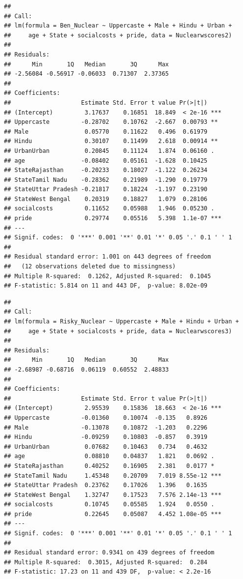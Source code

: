 \documentclass[
]{article}
\begin{document}
\begin{verbatim}
## 
## Call:
## lm(formula = Ben_Nuclear ~ Uppercaste + Male + Hindu + Urban + 
##     age + State + socialcosts + pride, data = Nuclearwscores2)
## 
## Residuals:
##      Min       1Q   Median       3Q      Max 
## -2.56084 -0.56917 -0.06033  0.71307  2.37365 
## 
## Coefficients:
##                    Estimate Std. Error t value Pr(>|t|)    
## (Intercept)         3.17637    0.16851  18.849  < 2e-16 ***
## Uppercaste         -0.28702    0.10762  -2.667  0.00793 ** 
## Male                0.05770    0.11622   0.496  0.61979    
## Hindu               0.30107    0.11499   2.618  0.00914 ** 
## UrbanUrban          0.20845    0.11124   1.874  0.06160 .  
## age                -0.08402    0.05161  -1.628  0.10425    
## StateRajasthan     -0.20233    0.18027  -1.122  0.26234    
## StateTamil Nadu    -0.28362    0.21989  -1.290  0.19779    
## StateUttar Pradesh -0.21817    0.18224  -1.197  0.23190    
## StateWest Bengal    0.20319    0.18827   1.079  0.28106    
## socialcosts         0.11652    0.05988   1.946  0.05230 .  
## pride               0.29774    0.05516   5.398  1.1e-07 ***
## ---
## Signif. codes:  0 '***' 0.001 '**' 0.01 '*' 0.05 '.' 0.1 ' ' 1
## 
## Residual standard error: 1.001 on 443 degrees of freedom
##   (12 observations deleted due to missingness)
## Multiple R-squared:  0.1262, Adjusted R-squared:  0.1045 
## F-statistic: 5.814 on 11 and 443 DF,  p-value: 8.02e-09
\end{verbatim}

\begin{verbatim}
## 
## Call:
## lm(formula = Risky_Nuclear ~ Uppercaste + Male + Hindu + Urban + 
##     age + State + socialcosts + pride, data = Nuclearwscores3)
## 
## Residuals:
##      Min       1Q   Median       3Q      Max 
## -2.68987 -0.68716  0.06119  0.60552  2.48833 
## 
## Coefficients:
##                    Estimate Std. Error t value Pr(>|t|)    
## (Intercept)         2.95539    0.15836  18.663  < 2e-16 ***
## Uppercaste         -0.01360    0.10074  -0.135   0.8926    
## Male               -0.13078    0.10872  -1.203   0.2296    
## Hindu              -0.09259    0.10803  -0.857   0.3919    
## UrbanUrban          0.07682    0.10463   0.734   0.4632    
## age                 0.08810    0.04837   1.821   0.0692 .  
## StateRajasthan      0.40252    0.16905   2.381   0.0177 *  
## StateTamil Nadu     1.45348    0.20709   7.019 8.55e-12 ***
## StateUttar Pradesh  0.23762    0.17026   1.396   0.1635    
## StateWest Bengal    1.32747    0.17523   7.576 2.14e-13 ***
## socialcosts         0.10745    0.05585   1.924   0.0550 .  
## pride               0.22645    0.05087   4.452 1.08e-05 ***
## ---
## Signif. codes:  0 '***' 0.001 '**' 0.01 '*' 0.05 '.' 0.1 ' ' 1
## 
## Residual standard error: 0.9341 on 439 degrees of freedom
## Multiple R-squared:  0.3015, Adjusted R-squared:  0.284 
## F-statistic: 17.23 on 11 and 439 DF,  p-value: < 2.2e-16
\end{verbatim}
\end{document}

